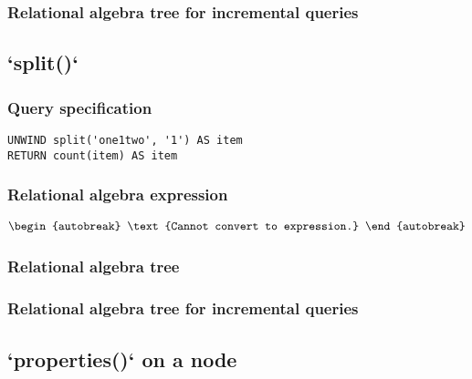 
\subsubsection*{Relational algebra tree for incremental queries}


\subsection{`split()`}

\subsubsection*{Query specification}

\begin{lstlisting}
UNWIND split('one1two', '1') AS item
RETURN count(item) AS item
\end{lstlisting}

\subsubsection*{Relational algebra expression}

\begin{align*}
\begin{autobreak}
\text{Cannot convert to expression.}
\end{autobreak}
\end{align*}

\subsubsection*{Relational algebra tree}


\subsubsection*{Relational algebra tree for incremental queries}


\subsection{`properties()` on a node}

